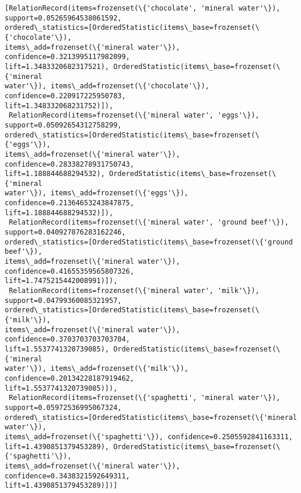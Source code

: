 \documentclass[14pt,a4paper,oneside]{extarticle}
\makeatletter
\newcommand{\boxspacing}{\kern\kvtcb@left@rule\kern\kvtcb@boxsep}
\newcommand{\prompt}[4]{
        {\ttfamily\llap{{\color{#2}[#3]:\hspace{3pt}#4}}\vspace{-\baselineskip}}
    }
\makeatother
\begin{document}
            \begin{tcolorbox}[breakable, size=fbox, boxrule=.5pt, pad at break*=1mm, opacityfill=0]
\prompt{Out}{outcolor}{16}{\boxspacing}
\begin{Verbatim}[commandchars=\\\{\}]
[RelationRecord(items=frozenset(\{'chocolate', 'mineral water'\}),
support=0.05265964538061592,
ordered\_statistics=[OrderedStatistic(items\_base=frozenset(\{'chocolate'\}),
items\_add=frozenset(\{'mineral water'\}), confidence=0.3213995117982099,
lift=1.3483320682317521), OrderedStatistic(items\_base=frozenset(\{'mineral
water'\}), items\_add=frozenset(\{'chocolate'\}), confidence=0.220917225950783,
lift=1.348332068231752)]),
 RelationRecord(items=frozenset(\{'mineral water', 'eggs'\}),
support=0.05092654312758299,
ordered\_statistics=[OrderedStatistic(items\_base=frozenset(\{'eggs'\}),
items\_add=frozenset(\{'mineral water'\}), confidence=0.28338278931750743,
lift=1.188844688294532), OrderedStatistic(items\_base=frozenset(\{'mineral
water'\}), items\_add=frozenset(\{'eggs'\}), confidence=0.21364653243847875,
lift=1.188844688294532)]),
 RelationRecord(items=frozenset(\{'mineral water', 'ground beef'\}),
support=0.040927876283162246,
ordered\_statistics=[OrderedStatistic(items\_base=frozenset(\{'ground beef'\}),
items\_add=frozenset(\{'mineral water'\}), confidence=0.41655359565807326,
lift=1.7475215442008991)]),
 RelationRecord(items=frozenset(\{'mineral water', 'milk'\}),
support=0.04799360085321957,
ordered\_statistics=[OrderedStatistic(items\_base=frozenset(\{'milk'\}),
items\_add=frozenset(\{'mineral water'\}), confidence=0.3703703703703704,
lift=1.5537741320739085), OrderedStatistic(items\_base=frozenset(\{'mineral
water'\}), items\_add=frozenset(\{'milk'\}), confidence=0.20134228187919462,
lift=1.5537741320739085)]),
 RelationRecord(items=frozenset(\{'spaghetti', 'mineral water'\}),
support=0.05972536995067324,
ordered\_statistics=[OrderedStatistic(items\_base=frozenset(\{'mineral water'\}),
items\_add=frozenset(\{'spaghetti'\}), confidence=0.2505592841163311,
lift=1.4390851379453289), OrderedStatistic(items\_base=frozenset(\{'spaghetti'\}),
items\_add=frozenset(\{'mineral water'\}), confidence=0.3430321592649311,
lift=1.4390851379453289)])]
\end{Verbatim}
\end{tcolorbox}
        
\end{document}
